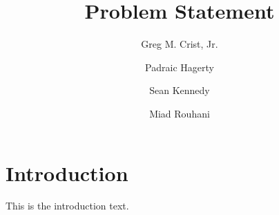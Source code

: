 \documentclass{article}
\title{Problem Statement}
\author{
    Greg M. Crist, Jr.
    \and
    Padraic Hagerty
    \and
    Sean Kennedy
    \and
    Miad Rouhani
}
\begin{document}
\maketitle

\section{Introduction}
This is the introduction text. \cite{segal}

\section{}




\printbibliography
\end{document}
